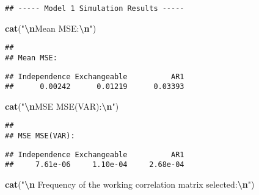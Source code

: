 \documentclass[
]{article}
\newenvironment{Shaded}{\begin{snugshade}}{\end{snugshade}}
\newcommand{\FunctionTok}[1]{\textcolor[rgb]{0.13,0.29,0.53}{\textbf{#1}}}
\newcommand{\NormalTok}[1]{#1}
\newcommand{\SpecialCharTok}[1]{\textcolor[rgb]{0.81,0.36,0.00}{\textbf{#1}}}
\newcommand{\StringTok}[1]{\textcolor[rgb]{0.31,0.60,0.02}{#1}}
\begin{document}
\begin{verbatim}
## ----- Model 1 Simulation Results -----
\end{verbatim}

\begin{Shaded}
\begin{Highlighting}[]
\FunctionTok{cat}\NormalTok{(}\StringTok{"}\SpecialCharTok{\textbackslash{}n}\StringTok{Mean MSE:}\SpecialCharTok{\textbackslash{}n}\StringTok{"}\NormalTok{)}
\end{Highlighting}
\end{Shaded}

\begin{verbatim}
## 
## Mean MSE:
\end{verbatim}

\begin{Shaded}
\end{Shaded}

\begin{verbatim}
## Independence Exchangeable          AR1 
##      0.00242      0.01219      0.03393
\end{verbatim}

\begin{Shaded}
\begin{Highlighting}[]
\FunctionTok{cat}\NormalTok{(}\StringTok{"}\SpecialCharTok{\textbackslash{}n}\StringTok{MSE MSE(VAR):}\SpecialCharTok{\textbackslash{}n}\StringTok{"}\NormalTok{)}
\end{Highlighting}
\end{Shaded}

\begin{verbatim}
## 
## MSE MSE(VAR):
\end{verbatim}

\begin{Shaded}
\end{Shaded}

\begin{verbatim}
## Independence Exchangeable          AR1 
##     7.61e-06     1.10e-04     2.68e-04
\end{verbatim}

\begin{Shaded}
\begin{Highlighting}[]
\FunctionTok{cat}\NormalTok{(}\StringTok{"}\SpecialCharTok{\textbackslash{}n}\StringTok{ Frequency of the working correlation matrix selected:}\SpecialCharTok{\textbackslash{}n}\StringTok{"}\NormalTok{)}
\end{Highlighting}
\end{Shaded}
\end{document}
